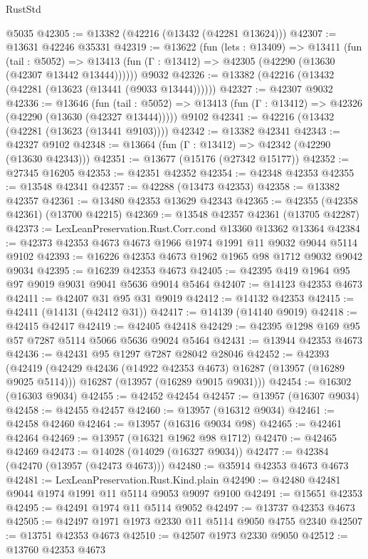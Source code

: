 \begin{lexlean}{RustStd}
\begin{coremodule}
    @5035
@42305 := @13382 (@42216 (@13432 (@42281 @13624)))
@42307 := @13631 @42246 @35331
@42319 := @13622
    (fun (lets : @13409) =>
    @13411
      (fun (tail : @5052) =>
      @13413 (fun (Γ : @13412) => @42305 (@42290 (@13630 (@42307 @13442 @13444))))))
    @9032
@42326 := @13382 (@42216 (@13432 (@42281 (@13623 (@13441 (@9033 @13444))))))
@42327 := @42307 @9032
@42336 := @13646
    (fun (tail : @5052) => @13413 (fun (Γ : @13412) => @42326 (@42290 (@13630 (@42327 @13444)))))
    @9102
@42341 := @42216 (@13432 (@42281 (@13623 (@13441 @9103))))
@42342 := @13382 @42341
@42343 := @42327 @9102
@42348 := @13664 (fun (Γ : @13412) => @42342 (@42290 (@13630 @42343)))
@42351 := @13677 (@15176 (@27342 @15177))
@42352 := @27345 @16205
@42353 := @42351 @42352
@42354 := @42348 @42353
@42355 := @13548 @42341
@42357 := @42288 (@13473 @42353)
@42358 := @13382 @42357
@42361 := @13480 @42353 @13629 @42343
@42365 := @42355 (@42358 @42361) (@13700 @42215)
@42369 := @13548 @42357 @42361 (@13705 @42287)
@42373 := LexLeanPreservation.Rust.Corr.cond @13360 @13362 @13364
@42384 := @42373 @42353 @4673 @4673 @1966 @1974 @1991 @11 @9032 @9044 @5114 @9102
@42393 := @16226 @42353 @4673 @1962 @1965 @98 @1712 @9032 @9042 @9034
@42395 := @16239 @42353 @4673
@42405 := @42395 @419 @1964 @95 @97 @9019 @9031 @9041 @5636 @9014 @5464
@42407 := @14123 @42353 @4673
@42411 := @42407 @31 @95 @31 @9019
@42412 := @14132 @42353
@42415 := @42411 (@14131 (@42412 @31))
@42417 := @14139 (@14140 @9019)
@42418 := @42415 @42417
@42419 := @42405 @42418
@42429 := @42395 @1298 @169 @95 @57 @7287 @5114 @5066 @5636 @9024 @5464
@42431 := @13944 @42353 @4673
@42436 := @42431 @95 @1297 @7287 @28042 @28046
@42452 := @42393
    (@42419
      (@42429 @42436 (@14922 @42353 @4673) @16287 (@13957 (@16289 @9025 @5114)))
      @16287
      (@13957 (@16289 @9015 @9031)))
@42454 := @16302 (@16303 @9034)
@42455 := @42452 @42454
@42457 := @13957 (@16307 @9034)
@42458 := @42455 @42457
@42460 := @13957 (@16312 @9034)
@42461 := @42458 @42460
@42464 := @13957 (@16316 @9034 @98)
@42465 := @42461 @42464
@42469 := @13957 (@16321 @1962 @98 @1712)
@42470 := @42465 @42469
@42473 := @14028 (@14029 (@16327 @9034))
@42477 := @42384 (@42470 (@13957 (@42473 @4673)))
@42480 := @35914 @42353 @4673 @4673
@42481 := LexLeanPreservation.Rust.Kind.plain
@42490 := @42480 @42481 @9044 @1974 @1991 @11 @5114 @9053 @9097 @9100
@42491 := @15651 @42353
@42495 := @42491 @1974 @11 @5114 @9052
@42497 := @13737 @42353 @4673
@42505 := @42497 @1971 @1973 @2330 @11 @5114 @9050 @4755 @2340
@42507 := @13751 @42353 @4673
@42510 := @42507 @1973 @2330 @9050
@42512 := @13760 @42353 @4673

\end{coremodule}
\end{lexlean}
